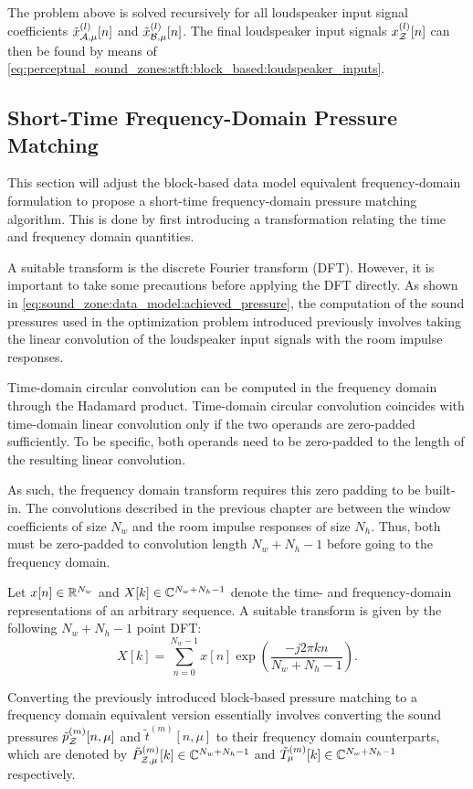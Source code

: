 The problem above is solved recursively for all loudspeaker input signal coefficients $\tilde{x}_{\mathcal{A},\mu}^{(l)}[n]$ and $\tilde{x}_{\mathcal{B},\mu}^{(l)}[n]$.
The final loudspeaker input signals $x_{\mathcal{Z}}^{(l)}[n]$  can then be found by means of \autoref{eq:perceptual_sound_zones:stft:block_based:loudspeaker_inputs}.

\subsection{Short-Time Frequency-Domain Pressure Matching}
\label{ch:perceptual_sound_zones:stft:stft_pm}
This section will adjust the block-based data model equivalent frequency-domain formulation to propose a short-time frequency-domain pressure matching algorithm.
This is done by first introducing a transformation relating the time and frequency domain quantities.

A suitable transform is the discrete Fourier transform (DFT).
However, it is important to take some precautions before applying the DFT directly.
As shown in \autoref{eq:sound_zone:data_model:achieved_pressure}, the computation of the sound pressures used in the optimization problem introduced previously involves taking the linear convolution of the loudspeaker input signals with the room impulse responses.

Time-domain circular convolution can be computed in the frequency domain through the Hadamard product.
Time-domain circular convolution coincides with time-domain linear convolution only if the two operands are zero-padded sufficiently.
To be specific, both operands need to be zero-padded to the length of the resulting linear convolution.

As such, the frequency domain transform requires this zero padding to be built-in.
The convolutions described in the previous chapter are between the window coefficients of size $N_w$ and the room impulse responses of size $N_h$.
Thus, both must be zero-padded to convolution length $N_w + N_h - 1$ before going to the frequency domain.

Let $x[n]\in\mathbb{R}^{N_w}$ and $X[k]\in\mathbb{C}^{N_w + N_h - 1}$ denote the time- and frequency-domain representations of an arbitrary sequence.  
A suitable transform is given by the following $N_w + N_h - 1$ point DFT:
\begin{equation}
    X[k] = \sum_{n=0}^{N_w - 1} x[n]\exp\left(\frac{-j2\pi k n}{N_w + N_h - 1}\right).
\end{equation}

Converting the previously introduced block-based pressure matching to a frequency domain equivalent version
essentially involves converting the sound pressures $\tilde{p}_{\mathcal{Z}}^{(m)}[n,\mu]$ and $\tilde{t}^{(m)}[n,\mu]$ 
to their frequency domain counterparts, which are denoted by $\tilde{P}_{\mathcal{Z},\mu}^{(m)}[k]\in\mathbb{C}^{N_w + N_h - 1}$ and $\tilde{T}_\mu^{(m)}[k]\in\mathbb{C}^{N_w + N_h - 1}$ respectively.

